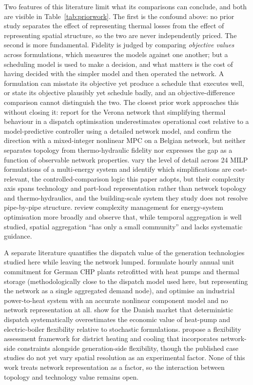 Two features of this literature limit what its comparisons can conclude, and both are
visible in Table~\ref{tab:priorwork}. The first is the confound above: no prior study
separates the effect of representing thermal losses from the effect of representing
spatial structure, so the two are never independently priced. The second is more
fundamental. Fidelity is judged by comparing \emph{objective values} across formulations,
which measures the models against one another; but a scheduling model is used to make a
decision, and what matters is the cost of having decided with the simpler model and then
operated the network. A formulation can misstate its objective yet produce a schedule
that executes well, or state its objective plausibly yet schedule badly, and an
objective-difference comparison cannot distinguish the two. The closest prior work
approaches this without closing it: \citet{Quaggiotto2021} report for the Verona network
that simplifying thermal behaviour in a dispatch optimisation underestimates operational
cost relative to a model-predictive controller using a detailed network model, and
\citet{Jansen2024} confirm the direction with a mixed-integer nonlinear MPC on a Belgian
network, but neither separates topology from thermo-hydraulic fidelity nor expresses the
gap as a function of observable network properties. \citet{Wirtz2021_complexity} vary the
level of detail across 24 MILP formulations of a multi-energy system and identify which
simplifications are cost-relevant, the controlled-comparison logic this paper adopts,
but their complexity axis spans technology and part-load representation rather than
network topology and thermo-hydraulics, and the building-scale system they study does not
resolve pipe-by-pipe structure. \citet{Kotzur2021} review complexity management for
energy-system optimisation more broadly and observe that, while temporal aggregation is
well studied, spatial aggregation ``has only a small community'' and lacks systematic
guidance.

A separate literature quantifies the dispatch value of the generation technologies
studied here while leaving the network lumped. \citet{Mollenhauer2018} formulate hourly
annual unit commitment for German CHP plants retrofitted with heat pumps and thermal
storage (methodologically close to the dispatch model used here, but representing the
network as a single aggregated demand node), and \citet{Walden2023} optimise an
industrial power-to-heat system with an accurate nonlinear component model and no network
representation at all. \citet{Nielsen2016} show for the Danish market that deterministic
dispatch systematically overestimates the economic value of heat-pump and electric-boiler
flexibility relative to stochastic formulations. \citet{Riedl2026} propose a flexibility
assessment framework for district heating and cooling that incorporates network-side
constraints alongside generation-side flexibility, though the published case studies do
not yet vary spatial resolution as an experimental factor. None of this work treats
network representation as a factor, so the interaction between topology and technology
value remains open.

